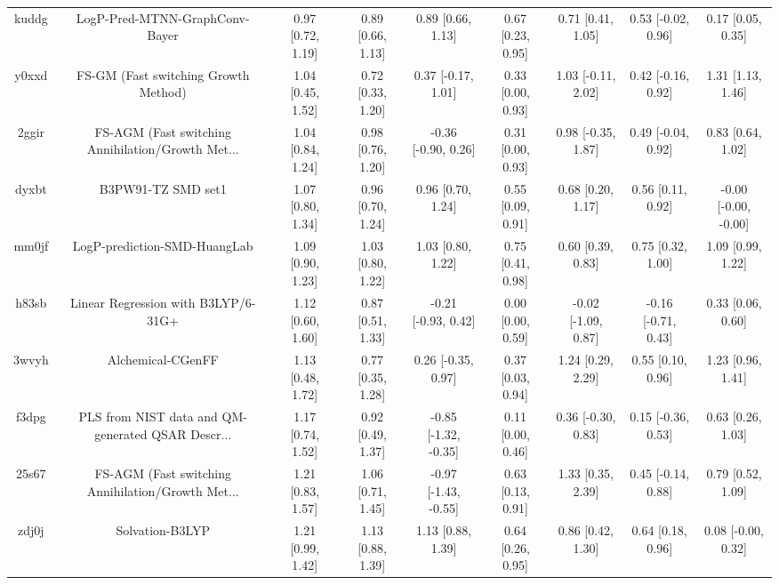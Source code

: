 \documentclass{article}
\begin{document}
\begin{center}
\begin{longtable}{|ccccccccc|}
 kuddg &                     LogP-Pred-MTNN-GraphConv-Bayer &  0.97 [0.72, 1.19] &  0.89 [0.66, 1.13] &     0.89 [0.66, 1.13] &  0.67 [0.23, 0.95] &    0.71 [0.41, 1.05] &   0.53 [-0.02, 0.96] &     0.17 [0.05, 0.35] \\
 y0xxd &               FS-GM (Fast switching Growth Method) &  1.04 [0.45, 1.52] &  0.72 [0.33, 1.20] &    0.37 [-0.17, 1.01] &  0.33 [0.00, 0.93] &   1.03 [-0.11, 2.02] &   0.42 [-0.16, 0.92] &     1.31 [1.13, 1.46] \\
 2ggir &  FS-AGM (Fast switching Annihilation/Growth Met... &  1.04 [0.84, 1.24] &  0.98 [0.76, 1.20] &   -0.36 [-0.90, 0.26] &  0.31 [0.00, 0.93] &   0.98 [-0.35, 1.87] &   0.49 [-0.04, 0.92] &     0.83 [0.64, 1.02] \\
 dyxbt &                                 B3PW91-TZ SMD set1 &  1.07 [0.80, 1.34] &  0.96 [0.70, 1.24] &     0.96 [0.70, 1.24] &  0.55 [0.09, 0.91] &    0.68 [0.20, 1.17] &    0.56 [0.11, 0.92] &  -0.00 [-0.00, -0.00] \\
 mm0jf &                       LogP-prediction-SMD-HuangLab &  1.09 [0.90, 1.23] &  1.03 [0.80, 1.22] &     1.03 [0.80, 1.22] &  0.75 [0.41, 0.98] &    0.60 [0.39, 0.83] &    0.75 [0.32, 1.00] &     1.09 [0.99, 1.22] \\
 h83sb &                Linear Regression with B3LYP/6-31G+ &  1.12 [0.60, 1.60] &  0.87 [0.51, 1.33] &   -0.21 [-0.93, 0.42] &  0.00 [0.00, 0.59] &  -0.02 [-1.09, 0.87] &  -0.16 [-0.71, 0.43] &     0.33 [0.06, 0.60] \\
 3wvyh &                                  Alchemical-CGenFF &  1.13 [0.48, 1.72] &  0.77 [0.35, 1.28] &    0.26 [-0.35, 0.97] &  0.37 [0.03, 0.94] &    1.24 [0.29, 2.29] &    0.55 [0.10, 0.96] &     1.23 [0.96, 1.41] \\
 f3dpg &  PLS from NIST data and QM-generated QSAR Descr... &  1.17 [0.74, 1.52] &  0.92 [0.49, 1.37] &  -0.85 [-1.32, -0.35] &  0.11 [0.00, 0.46] &   0.36 [-0.30, 0.83] &   0.15 [-0.36, 0.53] &     0.63 [0.26, 1.03] \\
 25s67 &  FS-AGM (Fast switching Annihilation/Growth Met... &  1.21 [0.83, 1.57] &  1.06 [0.71, 1.45] &  -0.97 [-1.43, -0.55] &  0.63 [0.13, 0.91] &    1.33 [0.35, 2.39] &   0.45 [-0.14, 0.88] &     0.79 [0.52, 1.09] \\
 zdj0j &                                    Solvation-B3LYP &  1.21 [0.99, 1.42] &  1.13 [0.88, 1.39] &     1.13 [0.88, 1.39] &  0.64 [0.26, 0.95] &    0.86 [0.42, 1.30] &    0.64 [0.18, 0.96] &    0.08 [-0.00, 0.32] \\

\end{longtable}
\end{center}
\end{document}
